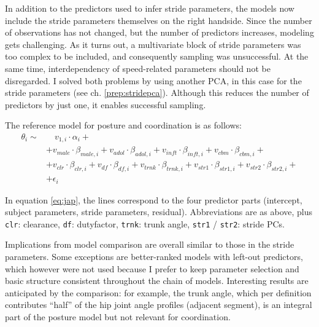 In addition to the predictors used to infer stride parameters, the models now include the stride parameters themselves on the right handside.
Since the number of observations has not changed, but the number of predictors increases, modeling gets challenging.
As it turns out, a multivariate block of stride parameters was too complex to be included, and consequently sampling was unsuccessful.
At the same time, interdependency of speed-related parameters should not be disregarded.
I solved both problems by using another PCA, in this case for the stride parameters (see ch. \ref{prep:stridepca}).
Although this reduces the number of predictors by just one, it enables successful sampling.

The reference model for posture and coordination is as follows:
\begin{equation}
\begin{split}
 \theta_{i}  \sim &\quad v_{1,i}\cdot\alpha_{i} +
\\ & + v_{male}\cdot\beta_{male,i} + v_{adol}\cdot\beta_{adol,i} + v_{inft}\cdot\beta_{inft,i} + v_{cbm}\cdot\beta_{cbm,i} +
\\ & + v_{clr}\cdot\beta_{clr,i} + v_{df}\cdot\beta_{df,i} + v_{trnk}\cdot\beta_{trnk,i} + v_{str1}\cdot\beta_{str1,i} + v_{str2}\cdot\beta_{str2,i} +
\\ & + \epsilon_{i}
\end{split}
 \label{eq:jap} \end{equation}

In equation \eqref{eq:jap}, the lines correspond to the four predictor parts (intercept, subject parameters, stride parameters, residual).
Abbreviations are as above, plus \texttt{clr}: clearance, \texttt{df}: dutyfactor, \texttt{trnk}: trunk angle, \texttt{str1} / \texttt{str2}: stride PCs.



Implications from model comparison are overall similar to those in the stride parameters.
Some exceptions are better-ranked models with left-out predictors, which however were not used because I prefer to keep parameter selection and basic structure consistent throughout the chain of models.
Interesting results are anticipated by the comparison: for example, the trunk angle, which per definition contributes ``half'' of the hip joint angle profiles (adjacent segment), is an integral part of the posture model but not relevant for coordination.

